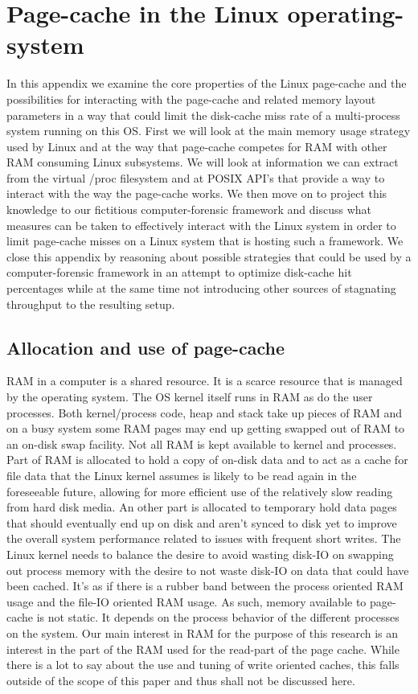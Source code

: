 \chapter{Page-cache in the Linux operating-system}
In this appendix we examine the core properties of the Linux page-cache and the possibilities for interacting with the page-cache and related memory layout parameters in a way that could limit the disk-cache miss rate of a multi-process system running on this OS. First we will look at the main memory usage strategy used by Linux and at the way that page-cache competes for RAM with other RAM consuming Linux subsystems. We will look at information we can extract from the virtual /proc filesystem and at POSIX API's that provide a way to interact with the way the page-cache works. We then move on to project this knowledge to our fictitious computer-forensic framework and discuss what measures can be taken to effectively interact with the Linux system in order to limit page-cache misses on a Linux system that is hosting such a framework. We close this appendix by reasoning about possible strategies that could be used by a computer-forensic framework in an attempt to optimize disk-cache hit percentages while at the same time not introducing other sources of stagnating throughput to the resulting setup.
\section{Allocation and use of page-cache}
RAM in a computer is a shared resource. It is a scarce resource that is managed by the operating system. The OS kernel itself runs in RAM as do the user processes. Both kernel/process code, heap and stack take up pieces of RAM and on a busy system some RAM pages may end up getting swapped out of RAM to an on-disk swap facility. Not all RAM is kept available to kernel and processes. Part of RAM is allocated to hold a copy of on-disk data and to act as a cache for file data that the Linux kernel assumes is likely to be read again in the foreseeable future, allowing for more efficient use of the relatively slow reading from hard disk media. An other part is allocated to temporary hold data pages that should eventually end up on disk and aren't synced to disk yet to improve the overall system performance related to issues with frequent short writes. The Linux kernel needs to balance the desire to avoid wasting disk-IO on swapping out process memory with the desire to not waste disk-IO on data that could have been cached. It's as if there is a rubber band between the process oriented RAM usage and the file-IO oriented RAM usage. As such, memory available to page-cache is not static. It depends on the process behavior of the different processes on the system. Our main interest in RAM for the purpose of this research is an interest in the part of the RAM used for the read-part of the page cache. While there is a lot to say about the use and tuning of write oriented caches, this falls outside of the scope of this paper and thus shall not be discussed here. 
